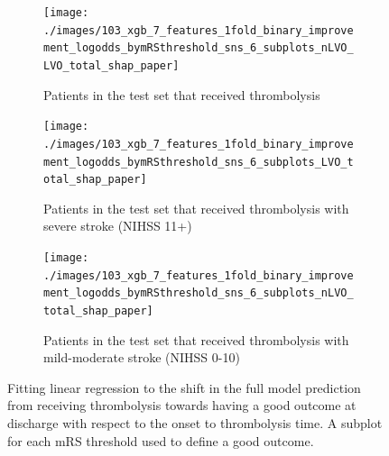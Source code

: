 \begin{figure}[!ht]
    \centering
    \begin{subfigure}[b]{1\textwidth}
      \centering
      \texttt{[image: ./images/103\_xgb\_7\_features\_1fold\_binary\_improvement\_logodds\_bymRSthreshold\_sns\_6\_subplots\_nLVO\_LVO\_total\_shap\_paper]}\\
      \caption{Patients in the test set that received thrombolysis}
      \label{fig:shap_shift_lvo_nlvo_full_model_prediction}
    \end{subfigure}
    \hfill
    \begin{subfigure}[b]{1\textwidth}
      \centering    
      \texttt{[image: ./images/103\_xgb\_7\_features\_1fold\_binary\_improvement\_logodds\_bymRSthreshold\_sns\_6\_subplots\_LVO\_total\_shap\_paper]}\\
      \caption{Patients in the test set that received thrombolysis with severe stroke (NIHSS 11+)}
      \label{fig:shap_shift_lvo_full_model_prediction}
    \end{subfigure}
    \hfill
    \begin{subfigure}[b]{1\textwidth}
      \centering
      \texttt{[image: ./images/103\_xgb\_7\_features\_1fold\_binary\_improvement\_logodds\_bymRSthreshold\_sns\_6\_subplots\_nLVO\_total\_shap\_paper]}\\
      \caption{Patients in the test set that received thrombolysis with mild-moderate stroke (NIHSS 0-10)}
      \label{fig:shap_shift_nlvo_full_model_prediction}
    \end{subfigure}
    \label{fig:shap_shift_full_model_prediction}
    \caption{Fitting linear regression to the shift in the full model prediction from receiving thrombolysis towards having a good outcome at discharge with respect to the onset to thrombolysis time. A subplot for each mRS threshold used to define a good outcome.}
\end{figure}


